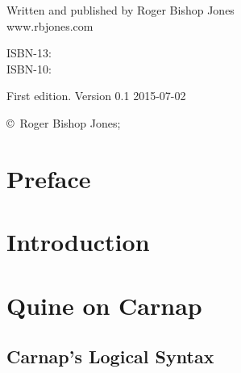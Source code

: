 \begin{titlepage}
\maketitle

\hspace{2in}

\vfill

\begin{centering}

{\small

Written and published by Roger Bishop Jones\\
www.rbjones.com\\

\vspace{0.2in}

ISBN-13: \\
ISBN-10: 

\vspace{0.2in}

}%
{\scriptsize

First edition. \hfil Version 0.1 \hfil 2015-07-02

\vspace{0.2in}

\copyright\ Roger Bishop Jones;

}%

\end{centering}

\thispagestyle{empty}

\end{titlepage}

{\parskip=0pt\tableofcontents}


\chapter*{Preface}\label{Preface}

\mainmatter

\chapter{Introduction}

\chapter{Quine on Carnap}

\section{Carnap's Logical Syntax}

